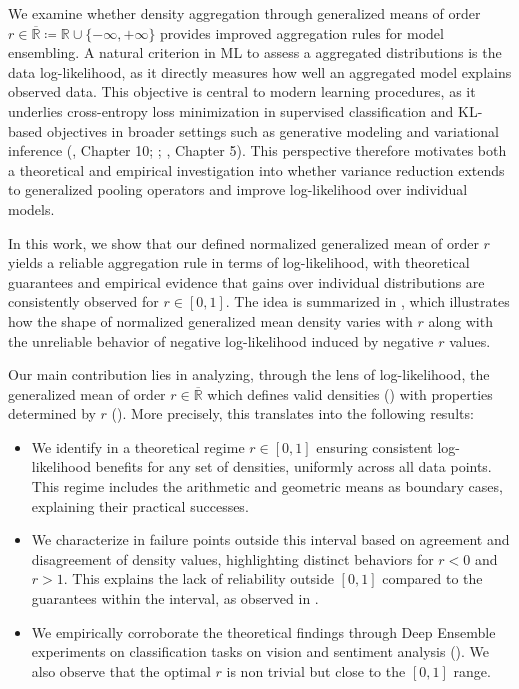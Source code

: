 \documentclass[accepted]{uai2026} %
\newcommand{\R}{\mathbb{R}}
\begin{document}
We examine whether density aggregation through generalized means of order $r \in \overline{\R} \coloneqq \R \cup \{-\infty,+\infty\}$ \citep{hardy1952inequalities} provides improved aggregation rules for model ensembling. A natural criterion in ML to assess a aggregated distributions is the data log-likelihood, as it directly measures how well an aggregated model explains observed data. This objective is central to modern learning procedures, as it underlies cross-entropy loss minimization in supervised classification and KL-based objectives in broader settings such as generative modeling and variational inference (\citealp{bishop2006pattern}, Chapter 10; \citealp{theis2015note}; \citealp{goodfellow2016deep}, Chapter 5). This perspective therefore motivates both a theoretical and empirical investigation into whether variance reduction extends to generalized pooling operators and improve log-likelihood over individual models.


In this work, we show that our defined normalized generalized mean of order $r$ yields a reliable aggregation rule in terms of log-likelihood, with theoretical guarantees and empirical evidence that gains over individual distributions are consistently observed for $r \in [0,1]$. The idea is summarized in , which illustrates how the shape of normalized generalized mean density varies with $r$ along with the unreliable behavior of negative log-likelihood induced by negative $r$ values.

Our main contribution lies in analyzing, through the lens of log-likelihood, the generalized mean of order $r \in \overline{\R}$ which defines valid densities () with properties determined by $r$ (). More precisely, this translates into the following results:
\begin{itemize}
\item We identify in  a theoretical regime $r \in [0,1]$ ensuring consistent log-likelihood benefits for any set of densities, uniformly across all data points. This regime includes the arithmetic and geometric means as boundary cases, explaining their practical successes.
\item We characterize in  failure points outside this interval based on agreement and disagreement of density values, highlighting distinct behaviors for $r<0$ and $r>1$. This explains the lack of reliability outside $[0,1]$ compared to the guarantees within the interval, as observed in . 
\item We empirically corroborate the theoretical findings through Deep Ensemble experiments on classification tasks on vision and sentiment analysis (). We also observe that the optimal $r$ is non trivial but close to the $[0,1]$ range.
\end{itemize}
\end{document}
